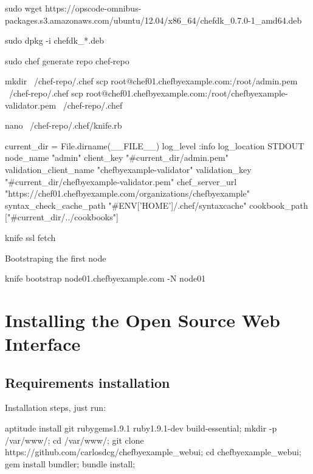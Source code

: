 \begin{codelisting}
\label{code:}
\codecaption{}
\begin{code}

sudo wget https://opscode-omnibus-packages.s3.amazonaws.com/ubuntu/12.04/x86_64/chefdk_0.7.0-1_amd64.deb

sudo dpkg -i chefdk_*.deb

sudo chef generate repo chef-repo

mkdir ~/chef-repo/.chef
scp root@chef01.chefbyexample.com:/root/admin.pem ~/chef-repo/.chef
scp root@chef01.chefbyexample.com:/root/chefbyexample-validator.pem ~/chef-repo/.chef

nano ~/chef-repo/.chef/knife.rb


current_dir = File.dirname(__FILE__)
log_level                :info
log_location             STDOUT
node_name                "admin"
client_key               "#{current_dir}/admin.pem"
validation_client_name   "chefbyexample-validator"
validation_key           "#{current_dir}/chefbyexample-validator.pem"
chef_server_url          "https://chef01.chefbyexample.com/organizations/chefbyexample"
syntax_check_cache_path  "#{ENV['HOME']}/.chef/syntaxcache"
cookbook_path            ["#{current_dir}/../cookbooks"]


knife ssl fetch

Bootstraping the first node

knife bootstrap node01.chefbyexample.com -N node01


\end{code}
\end{codelisting}

\section{Installing the Open Source Web Interface}

\subsection{Requirements installation}

Installation steps, just run:
\begin{codelisting}
\label{code:}
\codecaption{}
\begin{code}
aptitude install git rubygems1.9.1 ruby1.9.1-dev build-essential;
mkdir -p /var/www/; cd /var/www/; git clone https://github.com/carlosdcg/chefbyexample_webui; cd chefbyexample_webui;
gem install bundler;
bundle install;
\end{code}
\end{codelisting}

